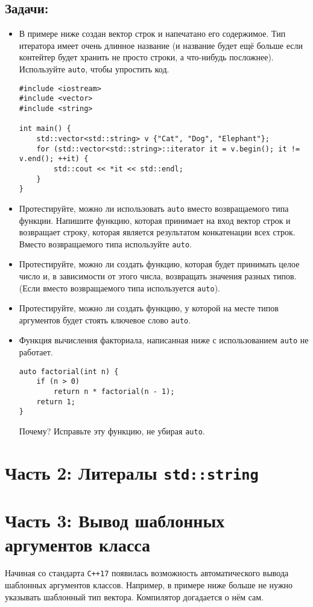 \documentclass{article}
\begin{document}
\subsection*{Задачи:}
\begin{itemize}
\item В примере ниже создан вектор строк и напечатано его содержимое. Тип итератора имеет очень длинное название (и название будет ещё больше если контейтер будет хранить не просто строки, а что-нибудь посложнее). Используйте \texttt{auto}, чтобы упростить код.
\begin{lstlisting}
#include <iostream>
#include <vector>
#include <string>

int main() {
    std::vector<std::string> v {"Cat", "Dog", "Elephant"};
    for (std::vector<std::string>::iterator it = v.begin(); it != v.end(); ++it) {
    	std::cout << *it << std::endl;    
    }
}
\end{lstlisting}

\item Протестируйте, можно ли использовать \texttt{auto} вместо возвращаемого типа функции. Напишите функцию, которая принимает на вход вектор строк и возвращает строку, которая является результатом конкатенации всех строк. Вместо возвращаемого типа используйте \texttt{auto}.
\item Протестируйте, можно ли создать функцию, которая будет принимать целое число и, в зависимости от этого числа, возвращать значения разных типов. (Если вместо возвращаемого типа используется \texttt{auto}).
\item Протестируйте, можно ли создать функцию, у которой на месте типов аргументов будет стоять ключевое слово \texttt{auto}.
\item Функция вычисления факториала, написанная ниже с использованием \texttt{auto} не работает. 
\begin{lstlisting}
auto factorial(int n) {
    if (n > 0)
        return n * factorial(n - 1);
    return 1;
}
\end{lstlisting}
Почему? Исправьте эту функцию, не убирая \texttt{auto}.

\end{itemize}


\newpage
\section*{Часть 2: Литералы \texttt{std::string}}

\newpage
\section*{Часть 3: Вывод шаблонных аргументов класса}
Начиная со стандарта \texttt{C++17} появилась возможность автоматического вывода шаблонных аргументов классов. Например, в примере ниже больше не нужно указывать шаблонный тип вектора. Компилятор догадается о нём сам.
\end{document}
